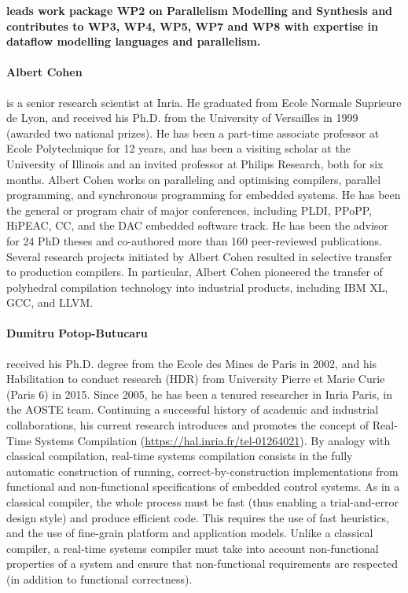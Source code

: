 \documentclass[a4paper,11pt]{article}
\begin{document}
\vspace{10pt}
\textbf{\INRIAshort leads work package WP2 on Parallelism Modelling and Synthesis
and contributes to WP3, WP4, WP5, WP7 and WP8 with expertise in dataflow 
modelling languages and parallelism.}
\vspace{10pt}

\paragraph{Albert Cohen} is a senior research scientist at Inria. He graduated from Ecole Normale Suprieure de Lyon, and
received his Ph.D. from the University of Versailles in 1999 (awarded two national prizes). He has been a part-time
associate professor at Ecole Polytechnique for 12 years, and has been a visiting scholar at the University of Illinois
and an invited professor at Philips Research, both for six months. Albert Cohen works on paralleling and optimising
compilers, parallel programming, and synchronous programming for embedded systems. He has been the general
or program chair of major conferences, including PLDI, PPoPP, HiPEAC, CC, and the DAC embedded software track.
He has been the advisor for 24 PhD theses and co-authored more than 160 peer-reviewed publications. Several
research projects initiated by Albert Cohen resulted in selective transfer to production compilers. In particular, Albert
Cohen pioneered the transfer of polyhedral compilation technology into industrial products, including IBM XL, GCC,
and LLVM.

\paragraph{Dumitru Potop-Butucaru} received his Ph.D. degree from the Ecole des Mines de Paris in 2002, and his Habilitation
to conduct research (HDR) from University Pierre et Marie Curie (Paris 6) in 2015. Since 2005, he has been
a tenured researcher in Inria Paris, in the AOSTE team. Continuing a successful history of academic and industrial
collaborations, his current research introduces and promotes the concept of Real-Time Systems Compilation
(\url{https://hal.inria.fr/tel-01264021}). By analogy with classical compilation, real-time systems compilation
consists in the fully automatic construction of running, correct-by-construction implementations from functional and
non-functional specifications of embedded control systems. As in a classical compiler, the whole process must be
fast (thus enabling a trial-and-error design style) and produce efficient code. This requires the use of fast heuristics,
and the use of fine-grain platform and application models. Unlike a classical compiler, a real-time systems compiler
must take into account non-functional properties of a system and ensure that non-functional requirements are respected
(in addition to functional correctness).
\end{document}
